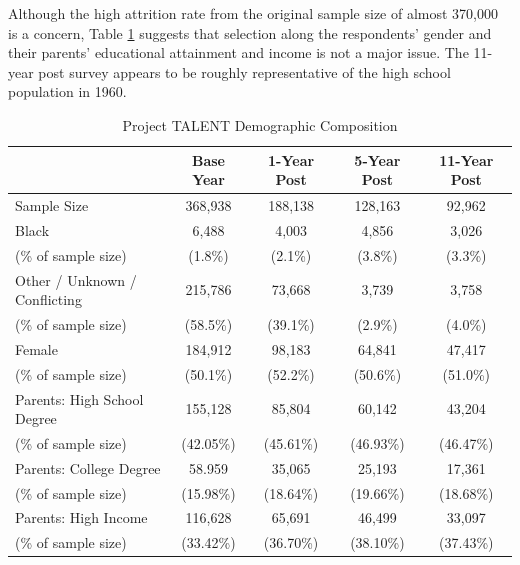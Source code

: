 \documentclass[onehalfspacing,11pt]{article}
\begin{document}
	Although the high attrition rate from the original sample size of almost 370,000 is a concern, Table \ref{tab:samplebywave} suggests that selection along the respondents' gender and their parents' educational attainment and income is not a major issue. The 11-year post survey appears to be roughly representative of the high school population in 1960.
	\begin{table}[h!]
		\centering 
		\begin{tabular}{lcccc}
			\toprule
			& Base Year & 1-Year Post & 5-Year Post & 11-Year Post\\
			\midrule
			Sample Size & 368,938 & 188,138 & 128,163 & 92,962 \\
			\midrule
			Black   & 6,488 & 4,003 & 4,856 & 3,026 \\
			
			\quad (\% of sample size) & (1.8\%) & (2.1\%) & (3.8\%) & (3.3\%) \\
			\midrule
			Other / Unknown / Conflicting & 215,786 & 73,668 & 3,739 & 3,758 \\
			\quad (\% of sample size) & (58.5\%) & (39.1\%) & (2.9\%) & (4.0\%) \\
			\midrule
			Female   & 184,912 & 98,183 & 64,841 & 47,417 \\
			\quad (\% of sample size) & (50.1\%) & (52.2\%) & (50.6\%) & (51.0\%) \\
			\midrule
			Parents: High School Degree & 155,128 & 85,804 & 60,142 & 43,204 \\
			\quad (\% of sample size) & (42.05\%) & (45.61\%) & (46.93\%) & (46.47\%)\\
			\midrule
			Parents: College Degree & 58.959 & 35,065 & 25,193 & 17,361 \\
			\quad (\% of sample size) & (15.98\%) & (18.64\%) & (19.66\%) & (18.68\%)\\
			\midrule
			Parents: High Income & 116,628 & 65,691 & 46,499 & 33,097 \\
			\quad (\% of sample size) & (33.42\%) & (36.70\%) & (38.10\%) & (37.43\%) \\
			\midrule
			\bottomrule
		\end{tabular}
		
		\caption{Project TALENT Demographic Composition}
		\label{tab:samplebywave}
	\end{table}
	
\end{document}
